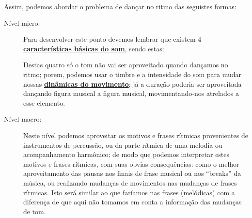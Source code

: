 Assim, podemos abordar o problema de dançar no ritmo das seguistes formas:
\begin{description}
\item [Nível micro:] Para desenvolver este ponto devemos lembrar 
que existem 4 \hyperref[sec:carateristasom]{\textbf{características básicas do som}},
sendo estas: 
Destas quatro só o tom não vai ser aproveitado quando dançamos no ritmo;
porem, podemos usar o timbre e a intensidade do som para mudar nossas 
\hyperref[sec:musicalidade:dinamicas]{\textbf{dinâmicas do movimento}};
já a duração poderia ser aproveitada dançando figura musical a figura musical,
movimentando-nos atrelados a esse elemento. 


\item [Nível macro:] Neste nível podemos aproveitar os  motivos e frases rítmicas
provenientes de instrumentos de percussão, ou da parte rítmica de uma melodia ou acompanhamento harmônico;
de modo que podemos interpretar estes motivos e frases rítmicas, 
com suas obvias consequências: como o melhor aproveitamento das pausas
 nos finais de frase musical ou nos ``breaks'' da música,
ou realizando mudanças de movimentos nas mudanças de frases rítmicas.
Isto será similar ao que faríamos nas frases (melódicas) com a diferença de que aqui 
não tomamos em conta a informação das mudanças de tom.
\end{description}


